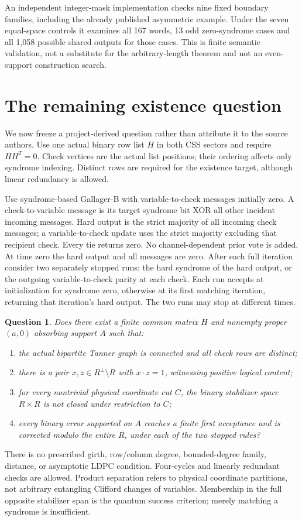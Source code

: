 \documentclass[11pt]{article}
\begin{document}
An independent integer-mask implementation checks nine fixed boundary families, including the already published asymmetric example. Under the seven equal-space controls it examines all 167 words, 13 odd zero-syndrome cases and all 1,058 possible shared outputs for those cases. This is finite semantic validation, not a substitute for the arbitrary-length theorem and not an even-support construction search.

\section{The remaining existence question}\label{sec:question}
We now freeze a project-derived question rather than attribute it to the source authors. Use one actual binary row list $H$ in both CSS sectors and require $HH^T=0$. Check vertices are the actual list positions; their ordering affects only syndrome indexing. Distinct rows are required for the existence target, although linear redundancy is allowed.

Use syndrome-based Gallager-B with variable-to-check messages initially zero. A check-to-variable message is its target syndrome bit XOR all other incident incoming messages. Hard output is the strict majority of all incoming check messages; a variable-to-check update uses the strict majority excluding that recipient check. Every tie returns zero. No channel-dependent prior vote is added. At time zero the hard output and all messages are zero. After each full iteration consider two separately stopped runs: the hard syndrome of the hard output, or the outgoing variable-to-check parity at each check. Each run accepts at initialization for syndrome zero, otherwise at its first matching iteration, returning that iteration's hard output. The two runs may stop at different times.

\newtheorem{question}{Question}
\begin{question}\label{q:full}
Does there exist a finite common matrix $H$ and nonempty proper $(a,0)$ absorbing support $A$ such that:
\begin{enumerate}
\item the actual bipartite Tanner graph is connected and all check rows are distinct;
\item there is a pair $x,z\in R^\perp\setminus R$ with $x\cdot z=1$, witnessing positive logical content;
\item for every nontrivial physical coordinate cut $C$, the binary stabilizer space $R\times R$ is not closed under restriction to $C$;
\item every binary error supported on $A$ reaches a finite first acceptance and is corrected modulo the entire $R$, under each of the two stopped rules?
\end{enumerate}
\end{question}
There is no prescribed girth, row/column degree, bounded-degree family, distance, or asymptotic LDPC condition. Four-cycles and linearly redundant checks are allowed. Product separation refers to physical coordinate partitions, not arbitrary entangling Clifford changes of variables. Membership in the full opposite stabilizer span is the quantum success criterion; merely matching a syndrome is insufficient.
\end{document}
